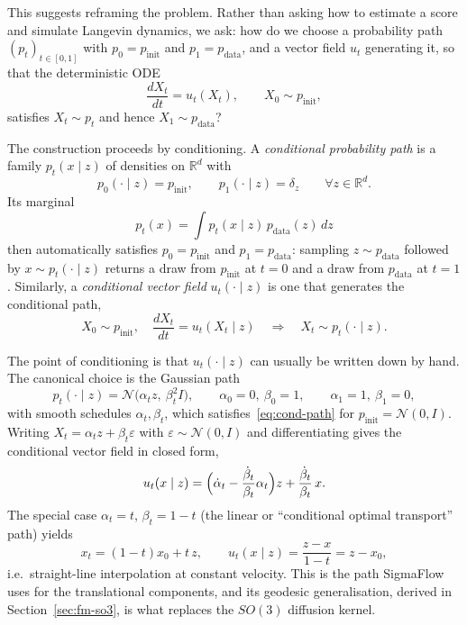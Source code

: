 \documentclass[a4paper,12pt]{article}
\theoremstyle{remark}
\begin{document}
This suggests reframing the problem. Rather than asking how to estimate a score and
simulate Langevin dynamics, we ask: how do we choose a probability path
$(p_t)_{t\in[0,1]}$ with $p_0=p_{\mathrm{init}}$ and $p_1=p_{\mathrm{data}}$, and a
vector field $u_t$ generating it, so that the deterministic ODE
\begin{equation}
\label{eq:ode}
\frac{dX_t}{dt}=u_t(X_t),
\qquad
X_0\sim p_{\mathrm{init}},
\end{equation}
satisfies $X_t\sim p_t$ and hence $X_1\sim p_{\mathrm{data}}$?

The construction proceeds by conditioning. A \emph{conditional probability path} is a
family $p_t(x\mid z)$ of densities on $\mathbb R^d$ with
\begin{equation}
\label{eq:cond-path}
p_0(\cdot\mid z)=p_{\mathrm{init}},
\qquad
p_1(\cdot\mid z)=\delta_z
\qquad
\forall z\in\mathbb R^d .
\end{equation}
Its marginal
\[
p_t(x)=\int p_t(x\mid z)\,p_{\mathrm{data}}(z)\,dz
\]
then automatically satisfies $p_0=p_{\mathrm{init}}$ and $p_1=p_{\mathrm{data}}$:
sampling $z\sim p_{\mathrm{data}}$ followed by $x\sim p_t(\cdot\mid z)$ returns a draw
from $p_{\mathrm{init}}$ at $t=0$ and a draw from $p_{\mathrm{data}}$ at $t=1$.
Similarly, a \emph{conditional vector field} $u_t(\cdot\mid z)$ is one that generates
the conditional path,
\[
X_0\sim p_{\mathrm{init}},
\quad
\frac{dX_t}{dt}=u_t(X_t\mid z)
\quad\Longrightarrow\quad
X_t\sim p_t(\cdot\mid z).
\]

The point of conditioning is that $u_t(\cdot\mid z)$ can usually be written down by
hand. The canonical choice is the Gaussian path
\begin{equation}
\label{eq:gauss-path}
p_t(\cdot\mid z)=\mathcal N\bigl(\alpha_t z,\ \beta_t^2 I\bigr),
\qquad
\alpha_0=0,\ \beta_0=1,
\qquad
\alpha_1=1,\ \beta_1=0,
\end{equation}
with smooth schedules $\alpha_t,\beta_t$, which satisfies~\eqref{eq:cond-path} for
$p_{\mathrm{init}}=\mathcal N(0,I)$. Writing $X_t=\alpha_t z+\beta_t\varepsilon$ with
$\varepsilon\sim\mathcal N(0,I)$ and differentiating gives the conditional vector field
in closed form,
\begin{equation}
\label{eq:gauss-cvf}
u_t(x\mid z)
=
\Bigl(\dot\alpha_t-\frac{\dot\beta_t}{\beta_t}\alpha_t\Bigr)z
+
\frac{\dot\beta_t}{\beta_t}\,x .
\end{equation}
The special case $\alpha_t=t$, $\beta_t=1-t$ (the linear or ``conditional optimal
transport'' path) yields
\begin{equation}
\label{eq:linear-cvf}
x_t=(1-t)x_0+t\,z,
\qquad
u_t(x\mid z)=\frac{z-x}{1-t}=z-x_0 ,
\end{equation}
i.e.\ straight-line interpolation at constant velocity. This is the path SigmaFlow uses
for the translational components, and its geodesic generalisation, derived in
Section~\ref{sec:fm-so3}, is what replaces the $SO(3)$ diffusion kernel.
\end{document}
